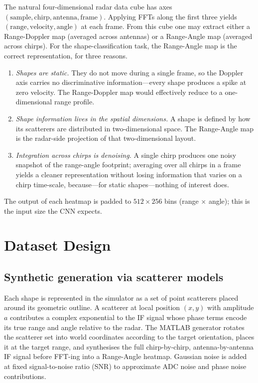 \documentclass[letterpaper,11pt,leqno]{article}
\begin{document}
The natural four-dimensional radar data cube has axes $(\mathrm{sample}, \mathrm{chirp}, \mathrm{antenna}, \mathrm{frame})$. Applying FFTs along the first three yields $(\mathrm{range}, \mathrm{velocity}, \mathrm{angle})$ at each frame. From this cube one may extract either a Range-Doppler map (averaged across antennas) or a Range-Angle map (averaged across chirps). For the shape-classification task, the Range-Angle map is the correct representation, for three reasons.

\begin{enumerate}
\item \emph{Shapes are static.} They do not move during a single frame, so the Doppler axis carries no discriminative information---every shape produces a spike at zero velocity. The Range-Doppler map would effectively reduce to a one-dimensional range profile.
\item \emph{Shape information lives in the spatial dimensions.} A shape is defined by how its scatterers are distributed in two-dimensional space. The Range-Angle map is the radar-side projection of that two-dimensional layout.
\item \emph{Integration across chirps is denoising.} A single chirp produces one noisy snapshot of the range-angle footprint; averaging over all chirps in a frame yields a cleaner representation without losing information that varies on a chirp time-scale, because---for static shapes---nothing of interest does.
\end{enumerate}

The output of each heatmap is padded to $512\times 256$ bins (range $\times$ angle); this is the input size the CNN expects.

\section{Dataset Design}\label{s:dataset}

\subsection{Synthetic generation via scatterer models}

Each shape is represented in the simulator as a set of point scatterers placed around its geometric outline. A scatterer at local position $(x,y)$ with amplitude $a$ contributes a complex exponential to the IF signal whose phase terms encode its true range and angle relative to the radar. The MATLAB generator rotates the scatterer set into world coordinates according to the target orientation, places it at the target range, and synthesises the full chirp-by-chirp, antenna-by-antenna IF signal before FFT-ing into a Range-Angle heatmap. Gaussian noise is added at fixed signal-to-noise ratio (SNR) to approximate ADC noise and phase noise contributions.
\end{document}
